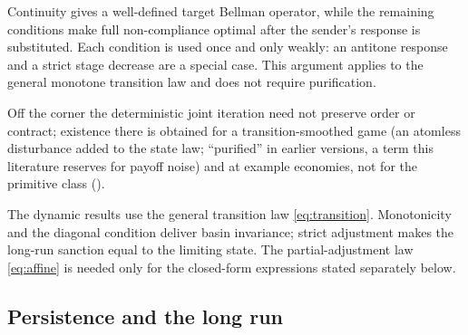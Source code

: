 Continuity gives a well-defined target Bellman operator, while the
remaining conditions make full non-compliance optimal after the sender's
response is substituted. Each condition is used once and only weakly: an
antitone response and a strict stage decrease are a special case. This argument applies to the general
monotone transition law and does not require purification.

Off the corner the deterministic joint iteration need not preserve order or
contract; existence there is obtained for a transition-smoothed game (an atomless
disturbance added to the state law; ``purified'' in earlier versions, a term this
literature reserves for payoff noise) and at example economies, not for
the primitive class ().

The dynamic results use the general transition law
\eqref{eq:transition}. Monotonicity and the diagonal condition deliver
basin invariance; strict adjustment makes the long-run sanction
equal to the limiting state. The partial-adjustment law \eqref{eq:affine} is needed only for the
closed-form expressions stated separately below.

\subsection{Persistence and the long run}

